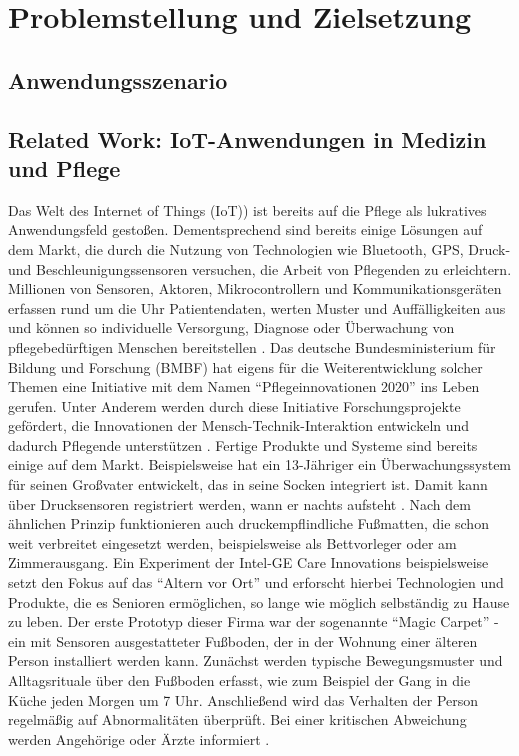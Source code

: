 \section{Problemstellung und Zielsetzung}\label{sec:definitionen}

\subsection{Anwendungsszenario}

\subsection{Related Work: IoT-Anwendungen in Medizin und Pflege}\label{ssec:rel.work}
Das Welt des Internet of Things (IoT)) ist bereits auf die Pflege als lukratives Anwendungsfeld gestoßen.
 Dementsprechend sind bereits einige Lösungen auf dem Markt, die durch die Nutzung von Technologien wie Bluetooth, GPS, Druck- und Beschleunigungssensoren versuchen, die Arbeit von Pflegenden zu erleichtern. Millionen von Sensoren, Aktoren, Mikrocontrollern und Kommunikationsgeräten erfassen rund um die Uhr Patientendaten, werten Muster und Auffälligkeiten aus und können so individuelle Versorgung, Diagnose oder Überwachung von pflegebedürftigen Menschen bereitstellen \citep[Vgl.][]{digikey}.
Das deutsche Bundesministerium für Bildung und Forschung (BMBF) hat eigens für die Weiterentwicklung solcher Themen eine Initiative mit dem Namen \enquote{Pflegeinnovationen 2020} ins Leben gerufen. Unter Anderem werden durch diese Initiative Forschungsprojekte gefördert, die Innovationen der Mensch-Technik-Interaktion entwickeln und dadurch Pflegende unterstützen \citep[Vgl.][]{bmbf}. Fertige Produkte und Systeme sind bereits einige auf dem Markt.
Beispielsweise hat ein 13-Jähriger ein Überwachungssystem für seinen Großvater entwickelt, das in seine Socken integriert ist. Damit kann über Drucksensoren registriert werden, wann er nachts aufsteht \citep[Vgl.][]{spiegel-alzheimer}. Nach dem ähnlichen Prinzip funktionieren auch druckempflindliche Fußmatten, die schon weit verbreitet eingesetzt werden, beispielsweise als Bettvorleger oder am Zimmerausgang.  Ein Experiment der Intel-GE Care Innovations beispielsweise setzt den Fokus auf das \enquote{Altern vor Ort} und erforscht hierbei Technologien und Produkte, die es Senioren ermöglichen, so lange wie möglich selbständig zu Hause zu leben. Der erste Prototyp dieser Firma war der sogenannte \enquote{Magic Carpet} - ein mit Sensoren ausgestatteter Fußboden, der in der Wohnung einer älteren Person installiert werden kann. Zunächst werden typische Bewegungsmuster und Alltagsrituale über den Fußboden erfasst, wie zum Beispiel der Gang in die Küche jeden Morgen um 7 Uhr. Anschließend wird das Verhalten der Person regelmäßig auf Abnormalitäten überprüft. Bei einer kritischen Abweichung werden Angehörige oder Ärzte informiert \citep[Vgl.][S.49]{bigdata}.\\
